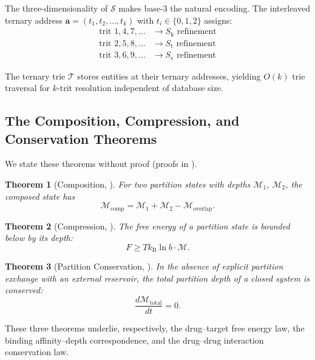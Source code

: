 \documentclass[11pt,twocolumn,a4paper]{article}
\newtheorem{theorem}{Theorem}[section]
\theoremstyle{definition}
\theoremstyle{remark}
\newcommand{\kB}{k_{\mathrm{B}}}
\newcommand{\Sk}{S_{\mathrm{k}}}
\newcommand{\St}{S_{\mathrm{t}}}
\newcommand{\Se}{S_{\mathrm{e}}}
\newcommand{\Sspace}{\mathcal{S}}
\newcommand{\Depth}{\mathcal{M}}
\newcommand{\Trie}{\mathcal{T}}
\begin{document}
The three-dimensionality of $\Sspace$ makes base-3 the natural encoding. The interleaved ternary address $\mathbf{a} = (t_1, t_2, \ldots, t_k)$ with $t_i \in \{0, 1, 2\}$ assigns:
\begin{align}
\text{trit } 1, 4, 7, \ldots &\to \Sk \text{ refinement} \\
\text{trit } 2, 5, 8, \ldots &\to \St \text{ refinement} \\
\text{trit } 3, 6, 9, \ldots &\to \Se \text{ refinement}
\end{align}

The ternary trie $\Trie$ stores entities at their ternary addresses, yielding $O(k)$ trie traversal for $k$-trit resolution independent of database size.

\subsection{The Composition, Compression, and Conservation Theorems}

We state these theorems without proof (proofs in \citep{sachikonye2025a}).

\begin{theorem}[Composition, \citep{sachikonye2025a}]
For two partition states with depths $\Depth_1$, $\Depth_2$, the composed state has
\begin{equation}
\Depth_{\mathrm{comp}} = \Depth_1 + \Depth_2 - \Depth_{\mathrm{overlap}}.
\end{equation}
\end{theorem}

\begin{theorem}[Compression, \citep{sachikonye2025a}]
The free energy of a partition state is bounded below by its depth:
\begin{equation}
F \geq T \kB \ln b \cdot \Depth.
\end{equation}
\end{theorem}

\begin{theorem}[Partition Conservation, \citep{sachikonye2025a}]
In the absence of explicit partition exchange with an external reservoir, the total partition depth of a closed system is conserved:
\begin{equation}
\frac{d\Depth_{\mathrm{total}}}{dt} = 0.
\end{equation}
\end{theorem}

These three theorems underlie, respectively, the drug--target free energy law, the binding affinity--depth correspondence, and the drug--drug interaction conservation law.
\end{document}
